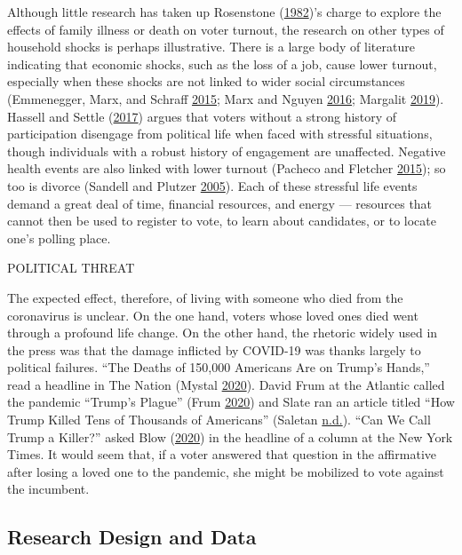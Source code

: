 \documentclass[
  12pt,
]{article}
\begin{document}
Although little research has taken up Rosenstone (\protect\hyperlink{ref-Rosenstone1982}{1982})'s charge to explore the effects of family illness or death on voter turnout, the research on other types of household shocks is perhaps illustrative. There is a large body of literature indicating that economic shocks, such as the loss of a job, cause lower turnout, especially when these shocks are not linked to wider social circumstances (Emmenegger, Marx, and Schraff \protect\hyperlink{ref-Emmenegger2015}{2015}; Marx and Nguyen \protect\hyperlink{ref-Marx2016}{2016}; Margalit \protect\hyperlink{ref-Margalit2019}{2019}). Hassell and Settle (\protect\hyperlink{ref-Hassell2017}{2017}) argues that voters without a strong history of participation disengage from political life when faced with stressful situations, though individuals with a robust history of engagement are unaffected. Negative health events are also linked with lower turnout (Pacheco and Fletcher \protect\hyperlink{ref-Pacheco2015}{2015}); so too is divorce (Sandell and Plutzer \protect\hyperlink{ref-Sandell2005}{2005}). Each of these stressful life events demand a great deal of time, financial resources, and energy --- resources that cannot then be used to register to vote, to learn about candidates, or to locate one's polling place.

POLITICAL THREAT

The expected effect, therefore, of living with someone who died from the coronavirus is unclear. On the one hand, voters whose loved ones died went through a profound life change. On the other hand, the rhetoric widely used in the press was that the damage inflicted by COVID-19 was thanks largely to political failures. ``The Deaths of 150,000 Americans Are on Trump's Hands,'' read a headline in The Nation (Mystal \protect\hyperlink{ref-Mystal2020}{2020}). David Frum at the Atlantic called the pandemic ``Trump's Plague'' (Frum \protect\hyperlink{ref-Frum2020}{2020}) and Slate ran an article titled ``How Trump Killed Tens of Thousands of Americans'' (Saletan \protect\hyperlink{ref-Saletan2020}{n.d.}). ``Can We Call Trump a Killer?'' asked Blow (\protect\hyperlink{ref-Blow2020}{2020}) in the headline of a column at the New York Times. It would seem that, if a voter answered that question in the affirmative after losing a loved one to the pandemic, she might be mobilized to vote against the incumbent.

\hypertarget{research-design-and-data}{%
\subsection*{Research Design and Data}\label{research-design-and-data}}
\end{document}
